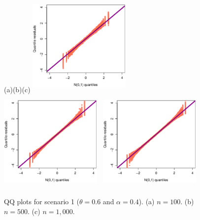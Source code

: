 \documentclass[12pt]{article}
\begin{document}
		
		\begin{figure}[htb!]
			\begin{center}
				(a)\hspace{4.5cm}(b)\hspace{4.5cm}(c)
				\includegraphics[width=5cm,height=5cm]{n_100_theta_0_6_alpha_0_4.eps}~
				\includegraphics[width=5cm,height=5cm]{n_500_theta_0_6_alpha_0_4.eps}~
				\includegraphics[width=5cm,height=5cm]{n_1000_theta_0_6_alpha_0_4.eps}
				\caption{QQ plots for scenario 1 ($\theta=0.6$ and $\alpha=0.4$). (a) $n=100$. (b) $n=500$. (c) $n = 1,000$.}\label{graf_simulacao_regressao_theta_0_6_alpha_0_4}
			\end{center}
		\end{figure}		
		
\end{document}

